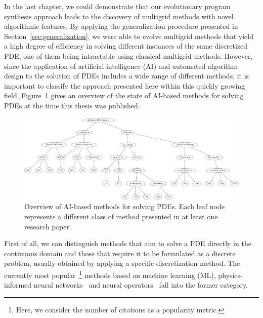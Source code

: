 In the last chapter, we could demonstrate that our evolutionary program synthesis approach leads to the discovery of multigrid methods with novel algorithmic features.
By applying the generalization procedure presented in  Section~\ref{sec:generalization}, we were able to evolve multigrid methods that yield a high degree of efficiency in solving different instances of the same discretized PDE, one of them being intractable using classical multigrid methods.
However, since the application of artificial intelligence (AI) and automated algorithm design to the solution of PDEs includes a wide range of different methods, it is important to classify the approach presented here within this quickly growing field.
Figure~\ref{fig:overview-ai-based-methods} gives an overview of the state of AI-based methods for solving PDEs at the time this thesis was published.
\begin{figure}
	\includegraphics[width=\textwidth]{figures/trees/related_work.pdf}
	\caption{Overview of AI-based methods for solving PDEs. Each leaf node represents a different class of method presented in at least one research paper.}
	\label{fig:overview-ai-based-methods}
\end{figure}
First of all, we can distinguish methods that aim to solve a PDE directly in the continuous domain and those that require it to be formulated as a discrete problem, usually obtained by applying a specific discretization method.
The currently most popular~\footnote{Here, we consider the number of citations as a popularity metric.} methods based on machine learning (ML), physics-informed neural networks~\cite{karniadakis2021physics,raissi2019physics,kharazmi2019variational,kharazmi2021hp} and neural operators~\cite{li2020fourier,guibas2021efficient,lu2021learning,li2021physics} fall into the former category.
